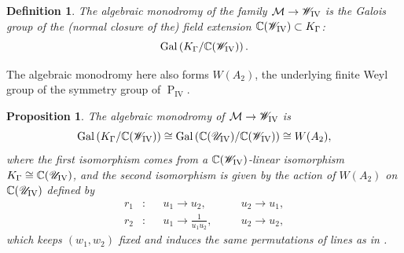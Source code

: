 \documentclass[a4paper,reqno]{amsart}
\numberwithin{equation}{section}
\newcommand{\C}{\mathbb{C}}
\newcommand{\pain}[1]{\operatorname{P}_{\mathrm{#1}}}
\newtheorem{definition}[theorem]{Definition}
\newtheorem{proposition}[theorem]{Proposition}
\numberwithin{equation}{section}
\begin{document}
    

\begin{definition}
    The \emph{algebraic monodromy} of the family $\mathcal{M}\to \mathscr{W}_{\rm{IV}}$ is the Galois group of the (normal closure of the) field extension $\C(\mathscr{W}_{\rm{IV}})\subset K_{\Gamma}$:
    \begin{equation*}
        \operatorname{Gal}\left( K_{\Gamma}/ \C(\mathscr{W}_{\rm{IV}})\right).
    \end{equation*}
\end{definition}
The algebraic monodromy here also forms $W(A_2)$, the underlying finite Weyl group of the symmetry group of $\pain{IV}$.

\begin{proposition}  \label{prop:algebraicmonodromyPIV}
    The algebraic monodromy of $\mathcal{M}\to \mathscr{W}_{\rm{IV}}$ is 
    $$\operatorname{Gal}\left( K_{\Gamma}/ \C(\mathscr{W}_{\rm{IV}})\right) \cong \operatorname{Gal}\left( \C(\mathscr{U}_{\rm{IV}})/ \C(\mathscr{W}_{\rm{IV}})\right) \cong W(A_2),$$
    where the first isomorphism comes from a $\C(\mathscr{W}_{\rm{IV}})$-linear isomorphism $K_{\Gamma}\cong \C(\mathscr{U}_{\rm{IV}})$,  and the second isomorphism is given by the action of $W(A_2)$ on $\C(\mathscr{U}_{\rm{IV}})$ defined by 
    \begin{equation*}
        \begin{aligned}
    r_1 &: &&u_1\to u_2, \quad 
    &&u_2\to u_1, \\
    r_2 &: &&u_1\to \frac{1}{u_1u_2}, \quad 
    &&u_2\to u_2,
        \end{aligned}
    \end{equation*}
    which keeps $(w_1,w_2)$ fixed and induces the same permutations of lines as in .
\end{proposition}
\end{document}
